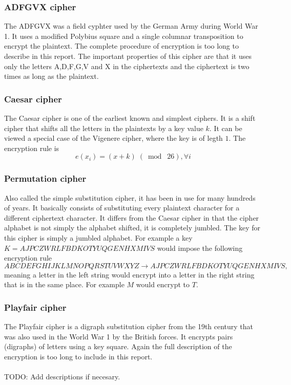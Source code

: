 \documentclass[a4paper]{article}
\begin{document}
\subsubsection*{ADFGVX cipher}
The ADFGVX was a field cyphter used by the German Army during World War 1. It uses a modified Polybius square and a single columnar transposition to encrypt the plaintext. The complete procedure of encryption is too long to describe in this report. The important properties of this cipher are that it uses only the letters A,D,F,G,V and X in the ciphertexts and the ciphertext is two times as long as the plaintext. 

\subsubsection*{Caesar cipher}
The Caesar cipher is one of the earliest known and simplest ciphers. It is a shift cipher that shifts all the letters in the plaintexts by a key value $k$. It can be viewed a special case of the Vigenere cipher, where the key is of legth $1$. The encryption rule is
$$e(x_{i}) = (x + k) \;(\bmod\; 26), \forall i$$

\subsubsection*{Permutation cipher}
Also called the simple substitution cipher, it has been in use for many hundreds of years. It basically consists of substituting every plaintext character for a different ciphertext character. It differs from the Caesar cipher in that the cipher alphabet is not simply the alphabet shifted, it is completely jumbled. The key for this cipher is simply a jumbled alphabet. For example a key $K = AJPCZWRLFBDKOTYUQGENHXMIVS$ would impose the following encryption rule
$$ABCDEFGHIJKLMNOPQRSTUVWXYZ \rightarrow AJPCZWRLFBDKOTYUQGENHXMIVS,$$
meaning a letter in the left string would encrypt into a letter in the right string that is in the same place. For example $M$ would encrypt to $T$.

\subsubsection*{Playfair cipher}
The Playfair cipher is a digraph substitution cipher from the 19th century that was also used in the World War 1 by the British forces. It encrypts pairs (digraphs) of letters using a key square. Again the full description of the encryption is too long to include in this report.\\
\\
TODO: Add descriptions if necesary.
\end{document}
